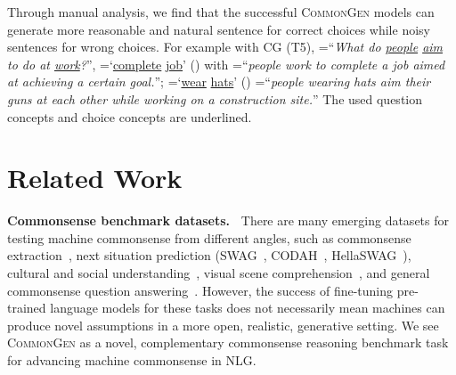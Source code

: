 \documentclass[11pt,a4paper]{article}
\begin{document}
     
    Through manual analysis, we find that the successful \textsc{CommonGen} models can generate more reasonable and natural sentence for correct choices while noisy sentences for wrong choices.
    For example with CG (T5), =``\textit{What do \underline{people} \underline{aim} to do at \underline{work}?}'',  =`\underline{complete} \underline{job}' (\cmark) with =``\textit{people work to complete a job aimed at achieving a certain goal.}''; 
    =`\underline{wear} \underline{hats}' (\xmark) =``\textit{people wearing hats aim their guns at each other while working on a construction site.}''
	The used question concepts and choice concepts are {underlined}.
			 
	






	


	
	






 	\section{Related Work}
	\label{sec:relatedwork}
	\noindent
	\textbf{Commonsense benchmark datasets.~}
There are many emerging datasets for testing machine commonsense from different angles,
	such as commonsense extraction~\cite{Xu2018AutomaticEO,Li2016CommonsenseKB}, next situation prediction ({SWAG}~\cite{Zellers2018SWAGAL}, CODAH~\cite{Chen2019CODAHAA}, HellaSWAG~\cite{Zellers2019HellaSwagCA}), cultural and social understanding~\cite{Lin2018MiningCD, sap2018atomic, sap-etal-2019-social}, visual scene comprehension~\cite{Zellers2019FromRT}, and general commonsense question answering~\cite{Talmor2018CommonsenseQAAQ, huang-etal-2019-cosmos, wang-etal-2019-make,wang-etal-2020-semeval}. 
	   However, the success of fine-tuning pre-trained language models for these tasks does not necessarily mean machines can produce novel assumptions in a more open, realistic, generative setting.
	We see \textsc{CommonGen} as a novel, complementary  commonsense reasoning benchmark task for advancing machine commonsense in NLG.


    
   
	
	
\end{document}

